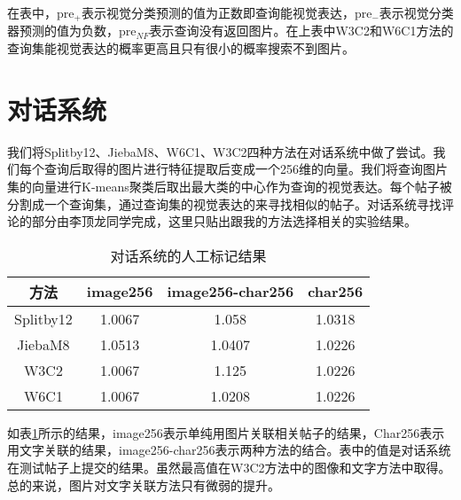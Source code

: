 在表中，pre$_{+}$表示视觉分类预测的值为正数即查询能视觉表达，pre$_{-}$表示视觉分类器预测的值为负数，pre$_{NF}$表示查询没有返回图片。在上表中W3C2和W6C1方法的查询集能视觉表达的概率更高且只有很小的概率搜索不到图片。

\section{对话系统}
我们将Splitby12、JiebaM8、W6C1、W3C2四种方法在对话系统中做了尝试。我们每个查询后取得的图片进行特征提取后变成一个256维的向量。我们将查询图片集的向量进行K-means聚类后取出最大类的中心作为查询的视觉表达。每个帖子被分割成一个查询集，通过查询集的视觉表达的来寻找相似的帖子。对话系统寻找评论的部分由李顶龙同学完成，这里只贴出跟我的方法选择相关的实验结果。

\begin{table}[htbp]
\centering
\caption{对话系统的人工标记结果} \label{tab:STC_result}
\begin{tabular}{ |c|c|c|c|}
    \hline
		方法 & image256 & image256-char256 & char256\\
	\hline 
		Splitby12 & 1.0067 & 1.058 & 1.0318 \\
	\hline 
		JiebaM8 & 1.0513 & 1.0407 & 1.0226  \\
	\hline
		W3C2 & 1.0067 & 1.125 & 1.0226  \\
	\hline 
		W6C1 & 1.0067 & 1.0208 & 1.0226\\
 	\hline
\end{tabular}
\end{table}

如表\ref{tab:STC_result}所示的结果，image256表示单纯用图片关联相关帖子的结果，Char256表示用文字关联的结果，image256-char256表示两种方法的结合。表中的值是对话系统在测试帖子上提交的结果。虽然最高值在W3C2方法中的图像和文字方法中取得。总的来说，图片对文字关联方法只有微弱的提升。



